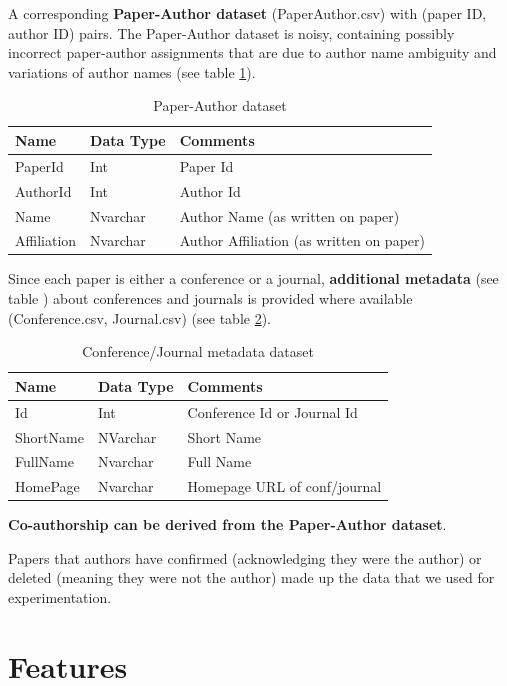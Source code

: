 \documentclass[letterpaper,12pt]{article}
\begin{document}
A corresponding \textbf{Paper-Author dataset} (PaperAuthor.csv) with (paper ID, author ID) pairs. The Paper-Author dataset is noisy, containing possibly incorrect paper-author assignments that are due to author name ambiguity and variations of author names (see table \ref{table:paperauthor}).

\begin{table}
\centering
  \caption{Paper-Author dataset}
\begin{tabular}{ |l |l |l |}
  \hline
 \textbf{Name} & \textbf{Data Type} & \textbf{Comments} \\ \hline
  PaperId & Int & Paper Id\\ \hline
  AuthorId & Int & Author Id\\ \hline
  Name & Nvarchar & Author Name (as written on paper)\\ \hline
  Affiliation & Nvarchar & Author Affiliation (as written on paper)\\ \hline
\end{tabular}
\label{table:paperauthor}
\end{table}

Since each paper is either a conference or a journal, \textbf{additional metadata} (see table ) about conferences and journals is provided where available (Conference.csv, Journal.csv) (see table \ref{table:confjournal}).

\begin{table}
\centering
  \caption{Conference/Journal metadata dataset}
\begin{tabular}{ |l |l |l |}
  \hline
 \textbf{Name} & \textbf{Data Type} & \textbf{Comments} \\ \hline
  Id & Int & Conference Id or Journal Id \\ \hline
  ShortName & NVarchar & Short Name\\ \hline
  FullName & Nvarchar & Full Name\\ \hline
  HomePage & Nvarchar & Homepage URL of conf/journal \\ \hline
\end{tabular}
\label{table:confjournal}
\end{table}

\textbf{Co-authorship can be derived from the Paper-Author dataset}.


Papers that authors have confirmed (acknowledging they were the author) or deleted (meaning they were not the author) made up the data that we used for experimentation.

\section{Features}
\end{document}
